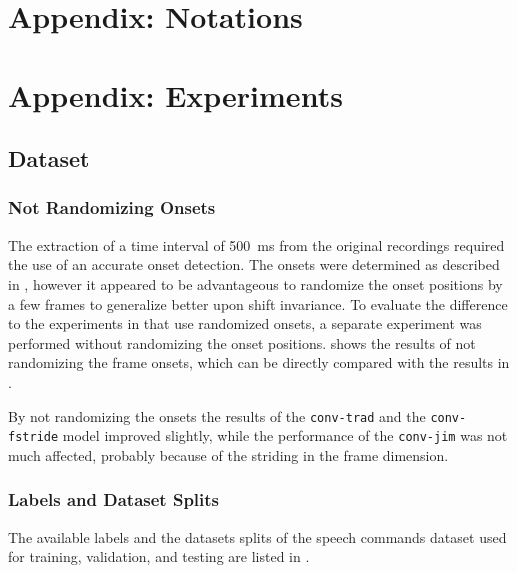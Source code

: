 



\chapter{Appendix: Notations}




\chapter{Appendix: Experiments}

\section{Dataset}

\subsection{Not Randomizing Onsets}
The extraction of a time interval of \SI{500}{\milli\second} from the original recordings required the use of an accurate onset detection.
The onsets were determined as described in , however it appeared to be advantageous to randomize the onset positions by a few frames to generalize better upon shift invariance.
To evaluate the difference to the experiments in  that use randomized onsets, a separate experiment was performed without randomizing the onset positions.
 shows the results of not randomizing the frame onsets, which can be directly compared with the results in .

By not randomizing the onsets the results of the \texttt{conv-trad} and the \texttt{conv-fstride} model improved slightly, while the performance of the \texttt{conv-jim} was not much affected, probably because of the striding in the frame dimension.

\subsection{Labels and Dataset Splits}
The available labels and the datasets splits of the speech commands dataset \cite{Warden2018} used for training, validation, and testing are listed in .




